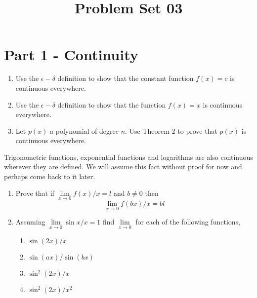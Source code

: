 \documentclass[9pt, a4paper, oneside]{amsart}
\title{Problem Set 03}
\begin{document}
\maketitle
\thispagestyle{fancy}


\section*{Part 1 - Continuity}

\begin{questions}[resume]

	\item
	\begin{enumerate}
		\item Use the $ \epsilon - \delta$ definition to show that the constant function $ f(x) = c $ is continuous everywhere.

		\item Use the $ \epsilon - \delta$ definition to show that the function $ f(x) = x $ is continuous everywhere.

		\item Let $ p(x)$ a polynomial of degree $ n$. Use Theorem 2 to prove that $p(x)$ is continuous everywhere.
	\end{enumerate}

	Trigonometric functions, exponential functions and logarithms are also continuous wherever they are defined. We will assume this fact without proof for now and perhaps come back to it later.

	\item
	\begin{enumerate}
		\item Prove that if $ \lim \limits_{x \rightarrow 0} f(x)/x = l$ and $ b \neq 0$ then $$ \lim \limits_{x \rightarrow 0} f(bx)/x = bl$$
		\item Assuming $ \lim \limits_{x \rightarrow 0} \sin x / x = 1$ find  $ \lim \limits_{x \rightarrow 0}$ for each of the following functions,
		      \begin{multicols}{3}
		      	\begin{enumerate}
		      		\item $\sin (2x)/ x$
		      		\item $\sin (ax)/ \sin(bx)$
		      		\item $\sin^2 (2x)/ x$
		      		\item $\sin^2 (2x)/ x^2$
		      	\end{enumerate}
		      \end{multicols}


\end{enumerate}
\end{questions}
\end{document}
